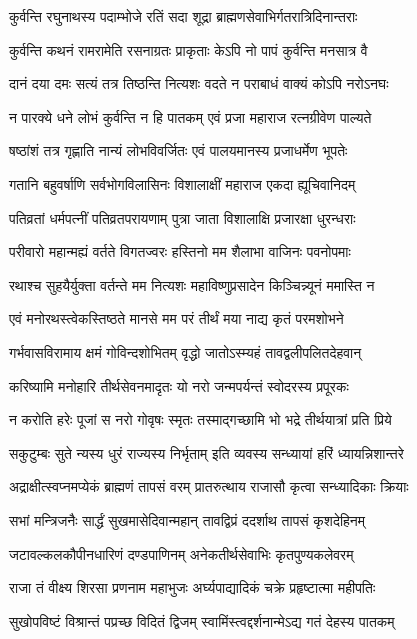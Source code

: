 \twolineshloka
{कुर्वन्ति रघुनाथस्य पदाम्भोजे रतिं सदा}
{शूद्रा ब्राह्मणसेवाभिर्गतरात्रिदिनान्तराः}%

\twolineshloka
{कुर्वन्ति कथनं रामरामेति रसनाग्रतः}
{प्राकृताः केऽपि नो पापं कुर्वन्ति मनसात्र वै}%

\twolineshloka
{दानं दया दमः सत्यं तत्र तिष्ठन्ति नित्यशः}
{वदते न पराबाधं वाक्यं कोऽपि नरोऽनघः}%

\twolineshloka
{न पारक्ये धने लोभं कुर्वन्ति न हि पातकम्}
{एवं प्रजा महाराज रत्नग्रीवेण पाल्यते}%

\twolineshloka
{षष्ठांशं तत्र गृह्णाति नान्यं लोभविवर्जितः}
{एवं पालयमानस्य प्रजाधर्मेण भूपतेः}%

\twolineshloka
{गतानि बहुवर्षाणि सर्वभोगविलासिनः}
{विशालाक्षीं महाराज एकदा ह्यूचिवानिदम्}%

\twolineshloka
{पतिव्रतां धर्मपत्नीं पतिव्रतपरायणाम्}
{पुत्रा जाता विशालाक्षि प्रजारक्षा धुरन्धराः}%

\twolineshloka
{परीवारो महान्मह्यं वर्तते विगतज्वरः}
{हस्तिनो मम शैलाभा वाजिनः पवनोपमाः}%

\twolineshloka
{रथाश्च सुहयैर्युक्ता वर्तन्ते मम नित्यशः}
{महाविष्णुप्रसादेन किञ्चिन्न्यूनं ममास्ति न}%

\twolineshloka
{एवं मनोरथस्त्वेकस्तिष्ठते मानसे मम}
{परं तीर्थं मया नाद्य कृतं परमशोभने}%

\twolineshloka
{गर्भवासविरामाय क्षमं गोविन्दशोभितम्}
{वृद्धो जातोऽस्म्यहं तावद्वलीपलितदेहवान्}%

\twolineshloka
{करिष्यामि मनोहारि तीर्थसेवनमादृतः}
{यो नरो जन्मपर्यन्तं स्वोदरस्य प्रपूरकः}%

\twolineshloka
{न करोति हरेः पूजां स नरो गोवृषः स्मृतः}
{तस्माद्गच्छामि भो भद्रे तीर्थयात्रां प्रति प्रिये}%

\twolineshloka
{सकुटुम्बः सुते न्यस्य धुरं राज्यस्य निर्भृताम्}
{इति व्यवस्य सन्ध्यायां हरिं ध्यायन्निशान्तरे}%

\twolineshloka
{अद्राक्षीत्स्वप्नमप्येकं ब्राह्मणं तापसं वरम्}
{प्रातरुत्थाय राजासौ कृत्वा सन्ध्यादिकाः क्रियाः}%

\twolineshloka
{सभां मन्त्रिजनैः सार्द्धं सुखमासेदिवान्महान्}
{तावद्विप्रं ददर्शाथ तापसं कृशदेहिनम्}%

\twolineshloka
{जटावल्कलकौपीनधारिणं दण्डपाणिनम्}
{अनेकतीर्थसेवाभिः कृतपुण्यकलेवरम्}%

\twolineshloka
{राजा तं वीक्ष्य शिरसा प्रणनाम महाभुजः}
{अर्घ्यपाद्यादिकं चक्रे प्रहृष्टात्मा महीपतिः}%

\twolineshloka
{सुखोपविष्टं विश्रान्तं पप्रच्छ विदितं द्विजम्}
{स्वामिंस्त्वद्दर्शनान्मेऽद्य गतं देहस्य पातकम्}%

